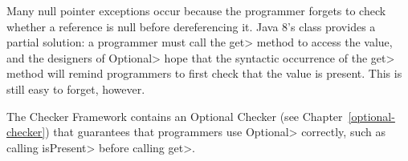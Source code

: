 %
%
%
%
%
%
%



Many null pointer exceptions occur because the programmer forgets to check
whether a reference is null before dereferencing it.  Java 8's
class provides a partial solution:  a programmer must call the \<get> method to
access the value, and the designers of \<Optional> hope that the syntactic
occurrence of the \<get> method will remind programmers to first check that
the value is present.  This is still easy to forget, however.

The Checker Framework contains an Optional Checker (see
Chapter~\ref{optional-checker}) that guarantees that programmers use
\<Optional> correctly, such as calling \<isPresent> before calling \<get>.

